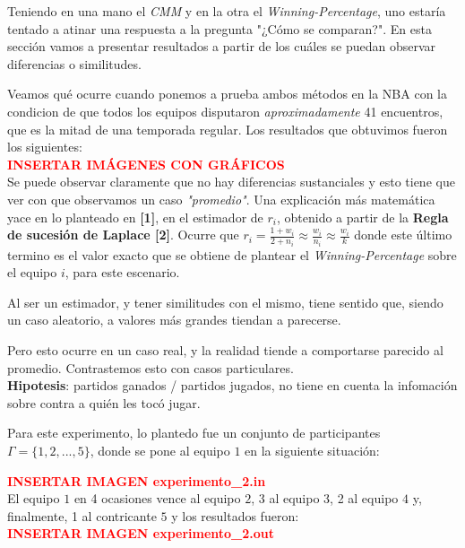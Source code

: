 Teniendo en una mano el \textit{CMM} y en la otra el \textit{Winning-Percentage}, uno estar\'ia tentado a atinar una respuesta a la pregunta "¿C\'omo se comparan?". En esta secci\'on vamos a presentar resultados a partir de los cu\'ales se puedan observar diferencias o similitudes.

Veamos qu\'e ocurre cuando ponemos a prueba ambos m\'etodos en la NBA con la condicion de que todos los equipos disputaron \textit{aproximadamente} 41 encuentros, que es la mitad de una temporada regular. Los resultados que obtuvimos fueron los siguientes: \\

\textcolor{red}{\textbf{INSERTAR IM\'AGENES CON GR\'AFICOS}} \\

Se puede observar claramente que no hay diferencias sustanciales y esto tiene que ver con que observamos un caso \textit{"promedio"}. Una explicaci\'on m\'as matem\'atica yace en lo planteado en \textbf{[1]}, en el estimador de $r_{i}$, obtenido a partir de la \textbf{Regla de sucesi\'on de Laplace [2]}. Ocurre que $r_{i} = \frac{1 + w_{i}}{2 + n_{i}} \approx \frac{w_{i}}{n_{i}} \approx \frac{w_{i}}{k}$ donde este \'ultimo termino es el valor exacto que se obtiene de plantear el \textit{Winning-Percentage} sobre el equipo $i$, para este escenario. 

Al ser un estimador, y tener similitudes con el mismo, tiene sentido que, siendo un caso aleatorio, a valores m\'as grandes tiendan a parecerse.

Pero esto ocurre en un caso real, y la realidad tiende a comportarse parecido al promedio. Contrastemos esto con casos particulares. \\

\textbf{Hipotesis}: partidos ganados / partidos jugados, no tiene en cuenta la infomaci\'on sobre contra a qui\'en les toc\'o jugar.

Para este experimento, lo plantedo fue un conjunto de participantes $\Gamma = \{1,2,...,5\}$, donde se pone al equipo $1$ en la siguiente situaci\'on:

\textcolor{red}{\textbf{INSERTAR IMAGEN experimento_2.in}} \\

El equipo $1$ en 4 ocasiones vence al equipo $2$, 3 al equipo $3$, 2 al equipo $4$ y, finalmente, 1 al contricante $5$ y los resultados fueron: \\

\textcolor{red}{\textbf{INSERTAR IMAGEN experimento_2.out}} \\

